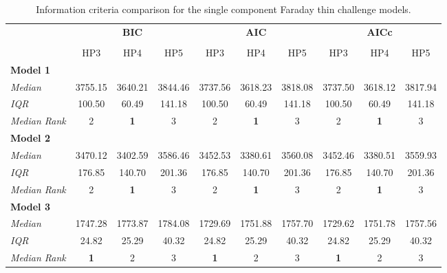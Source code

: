 \documentclass[fleqn,usenatbib]{mnras}
\begin{document}
\begin{table}
\caption{Information criteria comparison for the \cite{Sun_2015} single component Faraday thin challenge models. \label{tab:icthin}}
    \centering
    \begin{tabular}{@{\extracolsep{3pt}}lccccccccc@{}}
    \hline
     & \multicolumn{3}{c}{\textbf{BIC}} & \multicolumn{3}{c}{\textbf{AIC}} & \multicolumn{3}{c}{\textbf{AICc}} \\
     \cline{2-4} \cline{5-7} \cline{8-10} \\
     & HP3 & HP4 & HP5 & HP3 & HP4 & HP5 & HP3 & HP4 & HP5 \\\hline
    \textbf{Model 1} & & & & & & & & & \\
    \emph{Median} & 3755.15 & 3640.21 & 3844.46 & 3737.56 & 3618.23 & 3818.08 & 3737.50 & 3618.12 & 3817.94 \\
    \emph{IQR} & 100.50 & 60.49 & 141.18 & 100.50 & 60.49 & 141.18 & 100.50 & 60.49 & 141.18 \\
    \emph{Median Rank} & 2 & \textbf{1} & 3 & 2 & \textbf{1} & 3 & 2 & \textbf{1} & 3 \\\hline
    \textbf{Model 2} & & & & & & & & & \\
    \emph{Median} & 3470.12 & 3402.59 & 3586.46 & 3452.53 & 3380.61 & 3560.08 & 3452.46 & 3380.51 & 3559.93 \\
    \emph{IQR} & 176.85 & 140.70 & 201.36 & 176.85 & 140.70 & 201.36 & 176.85 & 140.70 & 201.36 \\
    \emph{Median Rank} & 2 & \textbf{1} & 3 & 2 & \textbf{1} & 3 & 2 & \textbf{1} & 3 \\\hline
    \textbf{Model 3} & & & & & & & & & \\
    \emph{Median} & 1747.28 & 1773.87 & 1784.08 &1729.69 & 1751.88 & 1757.70 & 1729.62 & 1751.78 & 1757.56 \\
    \emph{IQR} & 24.82 & 25.29 & 40.32 & 24.82 & 25.29 & 40.32 & 24.82 & 25.29 & 40.32 \\
    \emph{Median Rank} & \textbf{1} & 2 & 3 & \textbf{1} & 2 & 3 & \textbf{1} & 2 & 3 \\\hline
    \end{tabular}
\end{table}
\end{document}
